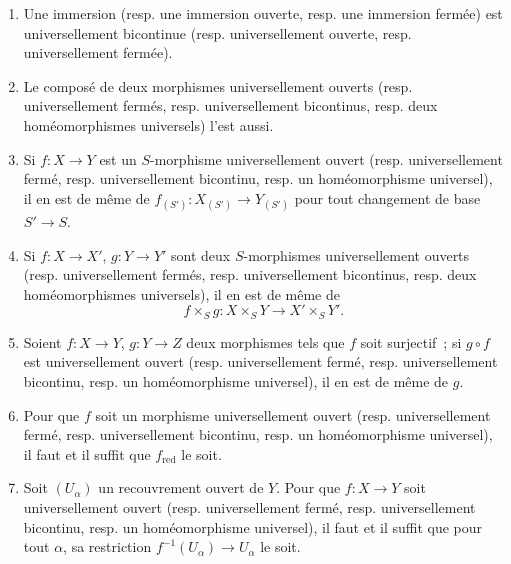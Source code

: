 \begin{proposition}[2.4.3]
\label{IV.2.4.3-fr}
\begin{enumerate}
\item[(i)] Une immersion (resp. une immersion ouverte, resp. une immersion
fermée) est universellement bicontinue (resp. universellement ouverte, resp.
universellement fermée).
\item[(ii)] Le composé de deux morphismes universellement ouverts (resp.
universellement fermés, resp. universellement bicontinus, resp. deux
homéomorphismes universels) l'est aussi.
\item[(iii)] Si $f:X\to Y$ est un $S$-morphisme universellement ouvert (resp.
universellement fermé, resp. universellement bicontinu, resp. un
homéomorphisme universel), il en est de même de
$f_{(S')}:X_{(S')}\to Y_{(S')}$ pour tout changement de base $S'\to S$.
\item[(iv)] Si $f:X\to X'$, $g:Y\to Y'$ sont deux $S$-morphismes
universellement ouverts (resp. universellement fermés, resp. universellement
bicontinus, resp. deux homéomorphismes universels), il en est de même de
\[
f\times_S g:X\times_S Y\longrightarrow X'\times_S Y'.
\]
\item[(v)] Soient $f:X\to Y$, $g:Y\to Z$ deux morphismes tels que $f$ soit
surjectif~; si $g\circ f$ est universellement ouvert (resp. universellement
fermé, resp. universellement bicontinu, resp. un homéomorphisme universel), il
en est de même de $g$.
\item[(vi)] Pour que $f$ soit un morphisme universellement ouvert (resp.
universellement fermé, resp. universellement bicontinu, resp. un
homéomorphisme universel), il faut et il suffit que $f_{\mathrm{red}}$ le soit.
\item[(vii)] Soit $(U_\alpha)$ un recouvrement ouvert de $Y$. Pour que
$f:X\to Y$ soit universellement ouvert (resp. universellement fermé, resp.
universellement bicontinu, resp. un homéomorphisme universel), il faut et il
suffit que pour tout $\alpha$, sa restriction
$f^{-1}(U_\alpha)\to U_\alpha$ le soit.
\end{enumerate}
\end{proposition}


